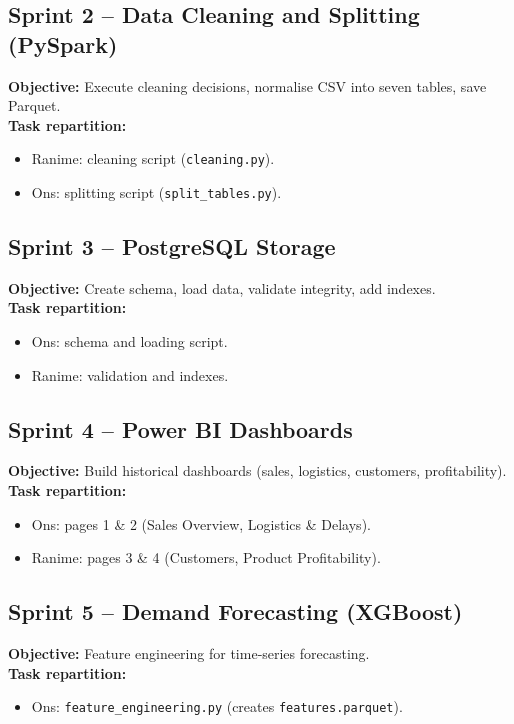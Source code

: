 \documentclass[12pt, a4paper]{report}
\begin{document}
\subsection*{Sprint 2 – Data Cleaning and Splitting (PySpark)}
\textbf{Objective:} Execute cleaning decisions, normalise CSV into seven tables, save Parquet. \\
\textbf{Task repartition:}
\begin{itemize}[noitemsep, topsep=0pt]
   \item Ranime: cleaning script (\texttt{cleaning.py}).
   \item Ons: splitting script (\texttt{split\_tables.py}).
\end{itemize}

\subsection*{Sprint 3 – PostgreSQL Storage}
\textbf{Objective:} Create schema, load data, validate integrity, add indexes. \\
\textbf{Task repartition:}
\begin{itemize}[noitemsep, topsep=0pt]
   \item Ons: schema and loading script.
   \item Ranime: validation and indexes.
\end{itemize}

\subsection*{Sprint 4 – Power BI Dashboards}
\textbf{Objective:} Build historical dashboards (sales, logistics, customers, profitability). \\
\textbf{Task repartition:}
\begin{itemize}[noitemsep, topsep=0pt]
   \item Ons: pages 1 \& 2 (Sales Overview, Logistics \& Delays).
   \item Ranime: pages 3 \& 4 (Customers, Product Profitability).
\end{itemize}

\subsection*{Sprint 5 – Demand Forecasting (XGBoost)}
\textbf{Objective:} Feature engineering for time‑series forecasting. \\
\textbf{Task repartition:}
\begin{itemize}[noitemsep, topsep=0pt]
   \item Ons: \texttt{feature\_engineering.py} (creates \texttt{features.parquet}).
\end{itemize}
\end{document}
